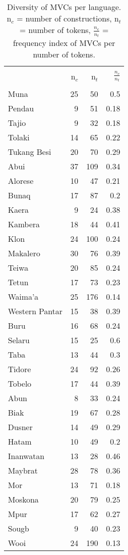 \begin{table}


\begin{tabular}{l r r r}
  \hline\hline
  \\
& n$_c$ & n$_t$ & $\frac{n_c}{n_t}$ \\ 
\\
  \hline
Muna	& 25 &	50 &	0.5	 \\
Pendau	& 9 &		51 &	0.18 \\
Tajio	& 9 &		32 &	0.18 \\ 
Tolaki	& 14 &	65 &	0.22 \\
Tukang Besi &	20 &	70 &	0.29 \\ \hline
Abui	& 37 &	109 &	0.34 \\
Alorese	& 10 &	47 &	0.21 \\
Bunaq	& 17 &	87 &	0.2	 \\
Kaera	& 9 &		24 &	0.38 \\
Kambera	& 18 &	44 &	0.41 \\
Klon	& 24 &	100 &	0.24 \\
Makalero &	30 &	76 &	0.39 \\
Teiwa	& 20 &	85 &	0.24 \\
Tetun	& 17 &	73 &	0.23 \\
Waima'a	& 25 &	176 &	0.14 \\
Western Pantar	& 15 &	38 &	0.39 \\ \hline
Buru	& 16 &	68 &	0.24 \\
Selaru	& 15 &	25 &	0.6	 \\
Taba	& 13 &	44 &	0.3	 \\
Tidore	& 24 &	92 &	0.26 \\
Tobelo	& 17 &	44 &	0.39 \\ \hline
Abun	& 8 &	33 &	0.24 \\
Biak	& 19 &	67 &	0.28 \\
Dusner	& 14 &	49 &	0.29 \\
Hatam	& 10 &	49 &	0.2	 \\
Inanwatan	& 13 &	28 &	0.46 \\
Maybrat	& 28 &	78 &	0.36 \\
Mor	& 13 &	71 &	0.18	 \\
Moskona	& 20 &	79 &	0.25 \\
Mpur	& 17 &	62 &	0.27 \\
Sougb	& 9 &	40 &	0.23 \\
Wooi	& 24 &	190 &	0.13 \\
\hline
\end{tabular}
\caption[Diversity of MVCs per language]{Diversity of MVCs per language. n$_c$ = number of constructions, n$_t$ = number of tokens, $\frac{n_c}{n_t}$ = frequency index of MVCs per number of tokens.}
\label{table:diversity_language}


\end{table}


